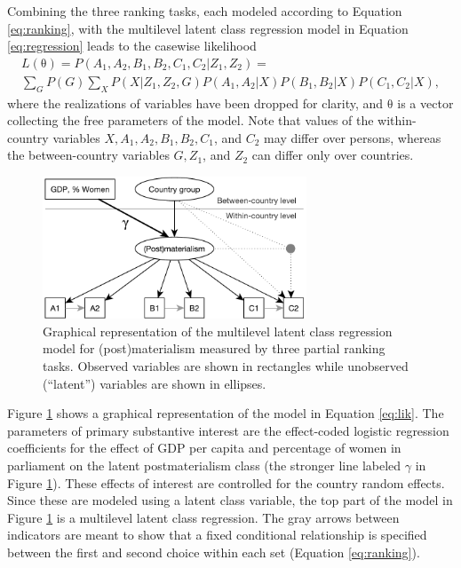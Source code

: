 \documentclass[letterpaper,12pt]{article}
\newcommand\vm[1]{%
\bm{\mathrm{#1}}}
\newcommand{\param}{\vm{\theta}}
\begin{document}

Combining the three ranking tasks, each modeled according to Equation \ref{eq:ranking}, with the multilevel latent class regression model in Equation \ref{eq:regression} leads to the casewise likelihood
\begin{multline}
L(\param) = 
	P(A_1, A_2, 
		B_1, B_2, 
		C_1, C_2 | Z_1, Z_2) = \\
	\sum_{G} P(G)	\sum_{X} P(X | Z_1, Z_2, G)
				P(A_1, A_2 | X)
				P(B_1, B_2 | X) 
				P(C_1, C_2 | X),
				\label{eq:lik}
\end{multline}
where the realizations of variables have been dropped for clarity, and $\param$ is a vector collecting the free parameters of the model.
Note that values of the within-country variables $X, A_1, A_2, B_1, B_2, C_1$, and $C_2$ may differ over persons, whereas the between-country variables $G, Z_1$, and $Z_2$ can differ only over countries. 


\begin{figure}\centering
	\includegraphics[width=0.7\textwidth]{figures/model}
	\caption{\label{fig:model}Graphical representation of 
	the multilevel latent class regression model for 
	(post)materialism measured by three partial ranking tasks. Observed variables are shown in rectangles while unobserved (``latent'') variables are shown in ellipses.	}
\end{figure}


Figure \ref{fig:model} shows a graphical representation of the model in Equation \ref{eq:lik}. 
The parameters of primary substantive interest are the effect-coded logistic regression coefficients for the effect of GDP per capita and percentage of women in parliament on the latent postmaterialism class (the stronger line labeled $\gamma$ in Figure \ref{fig:model}). 
These effects of interest are controlled for the country random effects. Since these are modeled using a latent class variable, the top part of the model in Figure \ref{fig:model} is a multilevel latent class regression. The gray arrows between indicators are meant to show that a fixed conditional relationship is specified between the first and second choice within each set (Equation \ref{eq:ranking}). 
\end{document}

